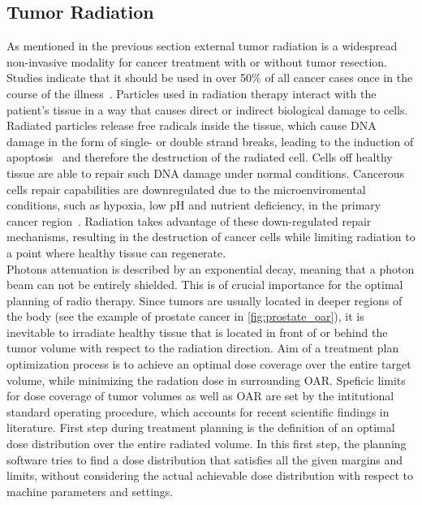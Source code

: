 \subsection{Tumor Radiation}

As mentioned in the previous section external tumor radiation is a widespread non-invasive modality for cancer treatment with or without tumor resection.
Studies indicate that it should be used in over 50\% of all cancer cases once in the course of the illness~\cite{delaney_role_2005}. 
Particles used in radiation therapy interact with the patient's tissue in a way that causes direct or indirect biological damage to cells.
Radiated particles release free radicals inside the tissue, which cause \ac{DNA} damage in the form of single- or double strand breaks, leading to the induction of apoptosis~\cite{kaina_dna_2003} and therefore the destruction of the radiated cell.
Cells off healthy tissue are able to repair such \acs{DNA} damage under normal conditions. 
Cancerous cells repair capabilities are downregulated due to the microenviromental conditions, such as hypoxia, low pH and nutrient deficiency, in the primary cancer region~\cite{li_dna_2021}.
Radiation takes advantage of these down-regulated repair mechanisms, resulting in the destruction of cancer cells while limiting radiation to a point where healthy tissue can regenerate.\\
Photons attenuation is described by an exponential decay, meaning that a photon beam can not be entirely shielded.
This is of crucial importance for the optimal planning of radio therapy.
Since tumors are usually located in deeper regions of the body (see the example of prostate cancer in \autoref{fig:prostate_oar}), it is inevitable to irradiate healthy tissue that is located in front of or behind the tumor volume with respect to the radiation direction. 
Aim of a treatment plan optimization process is to achieve an optimal dose coverage over the entire target volume, while minimizing the radation dose in surrounding \acs{OAR}.
Speficic limits for dose coverage of tumor volumes as well as \acs{OAR} are set by the intitutional standard operating procedure, which accounts for recent scientific findings in literature.
First step during treatment planning is the definition of an optimal dose distribution over the entire radiated volume.
In this first step, the planning software tries to find a dose distribution that satisfies all the given margins and limits, without considering the actual achievable dose distribution with respect to machine parameters and settings.
